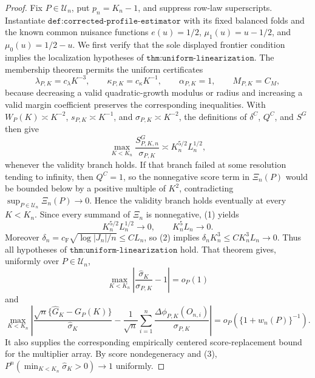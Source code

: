 \documentclass{article}
\begin{document}
\begin{proof}
Fix \(P\in\mathcal U_n\), put \(p_n=K_n-1\), and suppress row-law superscripts.  Instantiate \(\texttt{def:corrected-profile-estimator}\) with its fixed balanced folds and the known common nuisance functions \(e(u)=1/2\), \(\mu_1(u)=u-1/2\), and \(\mu_0(u)=1/2-u\).  We first verify that the sole displayed frontier condition implies the localization hypotheses of \(\texttt{thm:uniform-linearization}\).  The membership theorem permits the uniform certificates
\[
 \lambda_{P,K}=c_\lambda K^{-3},\qquad \kappa_{P,K}=c_\kappa K^{-1},
 \qquad \alpha_{P,K}=1,\qquad M_{P,K}=C_M,
\]
because decreasing a valid quadratic-growth modulus or radius and increasing a valid margin coefficient preserves the corresponding inequalities.  With \(W_P(K)\asymp K^{-2}\), \(s_{P,K}\asymp K^{-1}\), and \(\sigma_{P,K}\asymp K^{-2}\), the definitions of \(\delta^C\), \(Q^C\), and \(S^G\) then give
\[
 \max_{K<K_n}\frac{S^G_{P,K,n}}{\sigma_{P,K}}\asymp K_n^{5/2}L_n^{1/2},     \tag{1}
\]
whenever the validity branch holds.  If that branch failed at some resolution tending to infinity, then \(Q^C=1\), so the nonnegative score term in \(\Xi_n(P)\) would be bounded below by a positive multiple of \(K^2\), contradicting \(\sup_{P\in\mathcal U_n}\Xi_n(P)\to0\).  Hence the validity branch holds eventually at every \(K<K_n\).  Since every summand of \(\Xi_n\) is nonnegative, (1) yields
\[
 K_n^{5/2}L_n^{1/2}\longrightarrow0,\qquad K_n^5L_n\longrightarrow0.        \tag{2}
\]
Moreover \(\delta_n=c_{\mathrm F}\sqrt{\log|J_n|/n}\leq C L_n\), so (2) implies \(\delta_nK_n^3\leq CK_n^3L_n\to0\).  Thus all hypotheses of \(\texttt{thm:uniform-linearization}\) hold.  That theorem gives, uniformly over \(P\in\mathcal U_n\),
\[
 \max_{K<K_n}\left|\frac{\widehat\sigma_K}{\sigma_{P,K}}-1\right|=o_P(1)  \tag{3}
\]
and
\[
 \max_{K<K_n}\left|
 \frac{\sqrt n\{\widehat G_K-G_P(K)\}}{\widehat\sigma_K}
 -\frac1{\sqrt n}\sum_{i=1}^n
 \frac{\Delta\phi_{P,K}(O_{n,i})}{\sigma_{P,K}}
 \right|=o_P\!\left(\{1+w_n(P)\}^{-1}\right).                              \tag{4}
\]
It also supplies the corresponding empirically centered score-replacement bound for the multiplier array.  By score nondegeneracy and (3), \(P^n(\min_{K<K_n}\widehat\sigma_K>0)\to1\) uniformly.


\end{proof}
\end{document}
